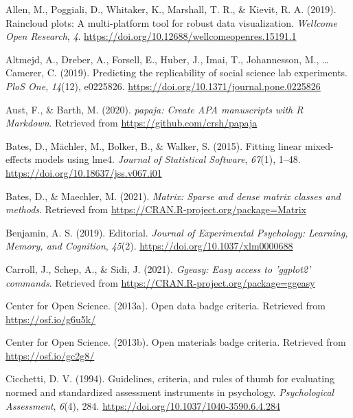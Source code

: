\documentclass[
  english,
  man,floatsintext]{apa6}
\newlength{\cslhangindent}
\newlength{\cslentryspacingunit} %
\newenvironment{CSLReferences}[2] %
 {%
  \setlength{\parindent}{0pt}
  \ifodd #1
  \let\oldpar\par
  \def\par{\hangindent=\cslhangindent\oldpar}
  \fi
  \setlength{\parskip}{#2\cslentryspacingunit}
 }%
 {}
\begin{document}
\hypertarget{refs}{}
\begin{CSLReferences}{1}{0}
\leavevmode{}%
Allen, M., Poggiali, D., Whitaker, K., Marshall, T. R., \& Kievit, R. A. (2019). Raincloud plots: A multi-platform tool for robust data visualization. \emph{Wellcome Open Research}, \emph{4}. \url{https://doi.org/10.12688/wellcomeopenres.15191.1}

\leavevmode{}%
Altmejd, A., Dreber, A., Forsell, E., Huber, J., Imai, T., Johannesson, M., \ldots{} Camerer, C. (2019). Predicting the replicability of social science lab experiments. \emph{PloS One}, \emph{14}(12), e0225826. \url{https://doi.org/10.1371/journal.pone.0225826}

\leavevmode{}%
Aust, F., \& Barth, M. (2020). \emph{{papaja}: {Create} {APA} manuscripts with {R Markdown}}. Retrieved from \url{https://github.com/crsh/papaja}

\leavevmode{}%
Bates, D., Mächler, M., Bolker, B., \& Walker, S. (2015). Fitting linear mixed-effects models using {lme4}. \emph{Journal of Statistical Software}, \emph{67}(1), 1--48. \url{https://doi.org/10.18637/jss.v067.i01}

\leavevmode{}%
Bates, D., \& Maechler, M. (2021). \emph{Matrix: Sparse and dense matrix classes and methods}. Retrieved from \url{https://CRAN.R-project.org/package=Matrix}

\leavevmode{}%
Benjamin, A. S. (2019). Editorial. \emph{Journal of Experimental Psychology: Learning, Memory, and Cognition}, \emph{45}(2). \url{https://doi.org/10.1037/xlm0000688}

\leavevmode{}%
Carroll, J., Schep, A., \& Sidi, J. (2021). \emph{Ggeasy: Easy access to 'ggplot2' commands}. Retrieved from \url{https://CRAN.R-project.org/package=ggeasy}

\leavevmode{}%
Center for Open Science. (2013a). Open data badge criteria. Retrieved from \url{https://osf.io/g6u5k/}

\leavevmode{}%
Center for Open Science. (2013b). Open materials badge criteria. Retrieved from \url{https://osf.io/gc2g8/}

\leavevmode{}%
Cicchetti, D. V. (1994). Guidelines, criteria, and rules of thumb for evaluating normed and standardized assessment instruments in psychology. \emph{Psychological Assessment}, \emph{6}(4), 284. \url{https://doi.org/10.1037/1040-3590.6.4.284}


\end{CSLReferences}
\end{document}
